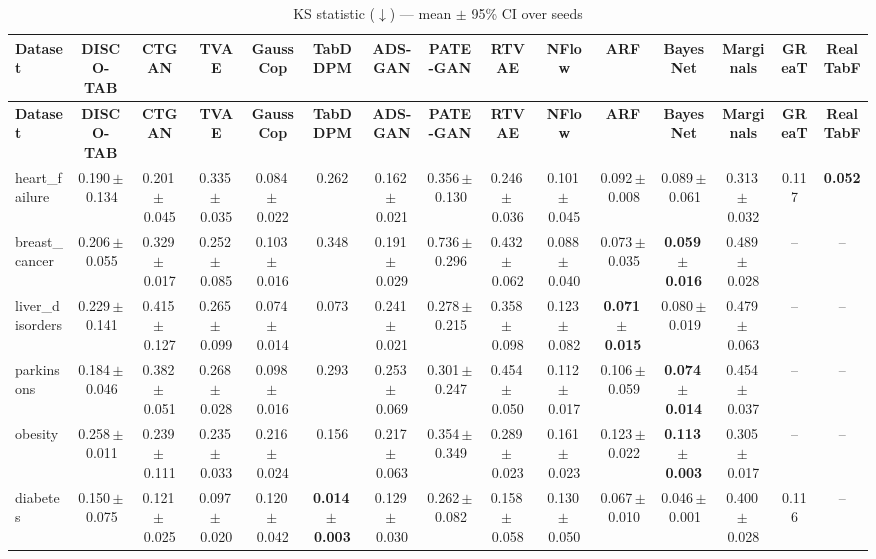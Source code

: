 \documentclass[8pt]{extarticle}
\begin{document}
\begin{longtable}{l*{14}{c}}
\caption{KS statistic ($\downarrow$) --- mean $\pm$ 95\% CI over seeds}\\
\toprule
\textbf{Dataset} & \textbf{DISCO-TAB} & \textbf{CTGAN} & \textbf{TVAE} & \textbf{GaussCop} & \textbf{TabDDPM} & \textbf{ADS-GAN} & \textbf{PATE-GAN} & \textbf{RTVAE} & \textbf{NFlow} & \textbf{ARF} & \textbf{BayesNet} & \textbf{Marginals} & \textbf{GReaT} & \textbf{RealTabF} \\
\midrule
\endfirsthead
\toprule
\textbf{Dataset} & \textbf{DISCO-TAB} & \textbf{CTGAN} & \textbf{TVAE} & \textbf{GaussCop} & \textbf{TabDDPM} & \textbf{ADS-GAN} & \textbf{PATE-GAN} & \textbf{RTVAE} & \textbf{NFlow} & \textbf{ARF} & \textbf{BayesNet} & \textbf{Marginals} & \textbf{GReaT} & \textbf{RealTabF} \\
\midrule
\endhead
\bottomrule
\endfoot
heart\_failure & 0.190\,$\pm$\,0.134 & 0.201\,$\pm$\,0.045 & 0.335\,$\pm$\,0.035 & 0.084\,$\pm$\,0.022 & 0.262 & 0.162\,$\pm$\,0.021 & 0.356\,$\pm$\,0.130 & 0.246\,$\pm$\,0.036 & 0.101\,$\pm$\,0.045 & 0.092\,$\pm$\,0.008 & 0.089\,$\pm$\,0.061 & 0.313\,$\pm$\,0.032 & 0.117 & \textbf{0.052} \\
breast\_cancer & 0.206\,$\pm$\,0.055 & 0.329\,$\pm$\,0.017 & 0.252\,$\pm$\,0.085 & 0.103\,$\pm$\,0.016 & 0.348 & 0.191\,$\pm$\,0.029 & 0.736\,$\pm$\,0.296 & 0.432\,$\pm$\,0.062 & 0.088\,$\pm$\,0.040 & 0.073\,$\pm$\,0.035 & \textbf{0.059\,$\pm$\,0.016} & 0.489\,$\pm$\,0.028 & -- & -- \\
liver\_disorders & 0.229\,$\pm$\,0.141 & 0.415\,$\pm$\,0.127 & 0.265\,$\pm$\,0.099 & 0.074\,$\pm$\,0.014 & 0.073 & 0.241\,$\pm$\,0.021 & 0.278\,$\pm$\,0.215 & 0.358\,$\pm$\,0.098 & 0.123\,$\pm$\,0.082 & \textbf{0.071\,$\pm$\,0.015} & 0.080\,$\pm$\,0.019 & 0.479\,$\pm$\,0.063 & -- & -- \\
parkinsons & 0.184\,$\pm$\,0.046 & 0.382\,$\pm$\,0.051 & 0.268\,$\pm$\,0.028 & 0.098\,$\pm$\,0.016 & 0.293 & 0.253\,$\pm$\,0.069 & 0.301\,$\pm$\,0.247 & 0.454\,$\pm$\,0.050 & 0.112\,$\pm$\,0.017 & 0.106\,$\pm$\,0.059 & \textbf{0.074\,$\pm$\,0.014} & 0.454\,$\pm$\,0.037 & -- & -- \\
obesity & 0.258\,$\pm$\,0.011 & 0.239\,$\pm$\,0.111 & 0.235\,$\pm$\,0.033 & 0.216\,$\pm$\,0.024 & 0.156 & 0.217\,$\pm$\,0.063 & 0.354\,$\pm$\,0.349 & 0.289\,$\pm$\,0.023 & 0.161\,$\pm$\,0.023 & 0.123\,$\pm$\,0.022 & \textbf{0.113\,$\pm$\,0.003} & 0.305\,$\pm$\,0.017 & -- & -- \\
diabetes & 0.150\,$\pm$\,0.075 & 0.121\,$\pm$\,0.025 & 0.097\,$\pm$\,0.020 & 0.120\,$\pm$\,0.042 & \textbf{0.014\,$\pm$\,0.003} & 0.129\,$\pm$\,0.030 & 0.262\,$\pm$\,0.082 & 0.158\,$\pm$\,0.058 & 0.130\,$\pm$\,0.050 & 0.067\,$\pm$\,0.010 & 0.046\,$\pm$\,0.001 & 0.400\,$\pm$\,0.028 & 0.116 & -- \\

\end{longtable}
\end{document}
